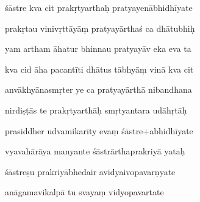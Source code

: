 \documentclass[article,12pt,a4paper]{memoir}%
\newcounter{parCount}
\begin{document}
	  
	  \pstart {} śāstre kva cit prakṛtyarthaḥ   pratyayenābhidhīyate 
	{}
	\pend%
      

	  
	  \pstart \leavevmode%
	prakṛtau vinivṛttāyāṃ pratyayārthaś ca dhātubhiḥ 
	{}
	\pend%
      

	  
	  \pstart {} yam artham āhatur bhinnau pratyayāv eka eva ta 
	{}
	\pend%
      

	  
	  \pstart \leavevmode%
	kva cid āha pacantīti dhātus tābhyāṃ vinā kva cit 
	{}
	\pend%
      

	  
	  \pstart {} anvākhyānasmṛter ye ca pratyayārthā nibandhana 
	{}
	\pend%
      

	  
	  \pstart \leavevmode%
	nirdiṣṭās te prakṛtyarthāḥ smṛtyantara udāhṛtāḥ 
	{}
	\pend%
      

	  
	  \pstart {} prasiddher udvamikarīty evaṃ śāstre+abhidhīyate 
	{}
	\pend%
      

	  
	  \pstart \leavevmode%
	vyavahārāya manyante śāstrārthaprakriyā yataḥ 
	{}
	\pend%
      

	  
	  \pstart {} śāstreṣu prakriyābhedair avidyaivopavarṇyate 
	{}
	\pend%
      

	  
	  \pstart \leavevmode%
	anāgamavikalpā tu svayaṃ vidyopavartate 
	{}
	\pend%
      
\end{document}
